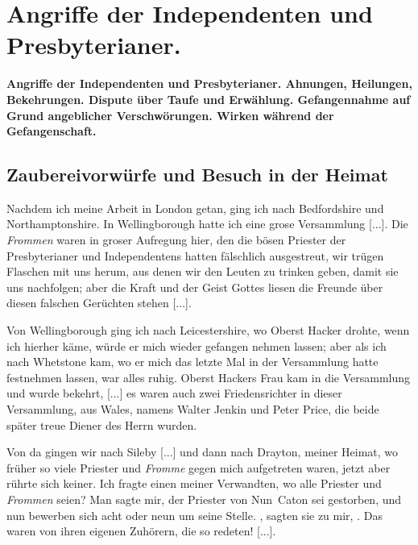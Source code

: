 


\chapter[Angriffe der Independenten und Presbyterianer.]{Angriffe der Independenten und Presbyterianer.}

\begin{center}
\textbf{Angriffe der Independenten und Presbyterianer. Ahnungen,
Heilungen, Bekehrungen. Dispute über Taufe und Erwählung.
Gefangennahme auf Grund angeblicher Verschwörungen. Wirken
während der Gefangenschaft.}
\end{center}

\section{Zaubereivorwürfe und Besuch in der Heimat}

Nachdem ich meine Arbeit in London getan, ging ich nach
Bedfordshire und
Northamptonshire. In 
Wellingborough hatte
ich eine grose Versammlung [...]. Die \textit{Frommen} waren in
groser Aufregung hier, den die bösen Priester der 
Presbyterianer und 
Independentens hatten fälschlich ausgestreut, 
wir trügen
Flaschen mit uns herum, aus denen wir den Leuten zu trinken
geben, damit sie uns nachfolgen; aber die Kraft und der Geist
Gottes liesen die Freunde über diesen falschen Gerüchten stehen [...].


Von Wellingborough ging ich nach Leicestershire, 
wo Oberst Hacker drohte, wenn ich hierher 
käme, würde er mich wieder gefangen nehmen lassen; aber als 
ich nach Whetstone kam, wo er
mich das letzte Mal in der Versammlung hatte festnehmen lassen,
war alles ruhig. Oberst Hackers Frau kam in die Versammlung 
und wurde bekehrt, [...] es waren auch zwei Friedensrichter 
in dieser Versammlung, aus Wales, namens Walter
Jenkin und Peter Price, 
die beide später treue Diener des Herrn wurden.

Von da gingen wir nach Sileby [...] und dann nach 
Drayton, meiner Heimat, wo früher so viele 
Priester und \textit{Fromme} gegen
mich aufgetreten waren, jetzt aber rührte sich keiner. Ich fragte
einen meiner Verwandten, wo alle Priester 
und \textit{Frommen} seien? Man sagte mir, der Priester von 
Nun~Caton sei gestorben, und nun bewerben 
sich acht oder neun um seine Stelle.
, sagten sie zu mir,
. Das waren von ihren
eigenen Zuhörern, die so redeten! [...].

